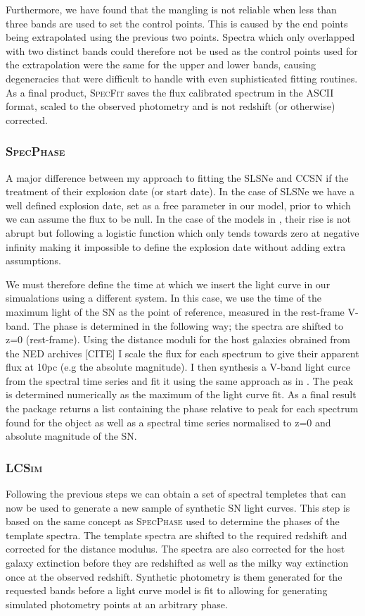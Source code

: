 Furthermore, we have found that the mangling is not reliable when less than three bands are used to set the control points. This is caused by the end points being extrapolated using the previous two points. Spectra which only overlapped with two distinct bands could therefore not be used as the control points used for the extrapolation were the same for the upper and lower bands, causing degeneracies that were difficult to handle with even suphisticated fitting routines. As a final product, \textsc{SpecFit} saves the flux calibrated spectrum in the ASCII format, scaled to the observed photometry and is not redshift (or otherwise) corrected.

\subsubsection{\textsc{SpecPhase}}
A major difference between my approach to fitting the SLSNe and CCSN if the treatment of their explosion date (or start date). In the case of SLSNe we have a well defined explosion date, set as a free parameter in our model, prior to which we can assume the flux to be null. In the case of the models in , their rise is not abrupt but following a logistic function which only tends towards zero at negative infinity making it impossible to define the explosion date without adding extra assumptions.

We must therefore define the time at which we insert the light curve in our simualations using a different system. In this case, we use the time of the maximum light of the SN as the point of reference, measured in the rest-frame V-band. The phase is determined in the following way; the spectra are shifted to z=0 (rest-frame). Using the distance moduli for the host galaxies obrained from the NED archives [CITE] I scale the flux for each spectrum to give their apparent flux at 10pc (e.g the absolute magnitude). I then synthesis a V-band light curce from the spectral time series and fit it using the same approach as in . The peak is determined numerically as the maximum of the light curve fit. As a final result the package returns a list containing the phase relative to peak for each spectrum found for the object as well as a spectral time series normalised to z=0 and absolute magnitude of the SN.

\subsubsection{\textsc{LCSim}}
Following the previous steps we can obtain a set of spectral templetes that can now be used to generate a new sample of synthetic SN light curves. This step is based on the same concept as \textsc{SpecPhase} used to determine the phases of the template spectra. The template spectra are shifted to the required redshift and corrected for the distance modulus. The spectra are also corrected for the host galaxy extinction before they are redshifted as well as the milky way extinction once at the observed redshift. Synthetic photometry is them generated for the requested bands before a light curve model is fit to allowing for generating simulated photometry points at an arbitrary phase.

